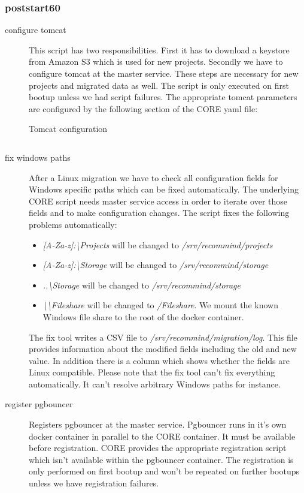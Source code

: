 			\subsubsection{poststart60}
			\begin{description}
				\item[configure tomcat] This script has two responsibilities. First it has to download a keystore from Amazon S3 which is used for new projects. Secondly we have to configure tomcat at the master service. These steps are necessary for new projects and migrated data as well. The script is only executed on first bootup unless we had script failures. The appropriate tomcat parameters are configured by the following section of the CORE yaml file:
				
				\begin{listing}[H]
					\caption{Tomcat configuration}
					\label{lst:p01:ch02:core_tomcat_desc}
					\inputminted{yaml}{\relative{chapter_02/section_3.2/tomcat_example.yaml}}
				\end{listing}
				\item[fix windows paths] After a Linux migration we have to check all configuration fields for Windows specific paths which can be fixed automatically. The underlying CORE script needs master service access in order to iterate over those fields and to make configuration changes. The script fixes the following problems automatically:
				\begin{itemize}
					\item \emph{[A-Za-z]:\textbackslash Projects} will be changed to \emph{/srv/recommind/projects}
					\item \emph{[A-Za-z]:\textbackslash Storage} will be changed to \emph{/srv/recommind/storage}
					\item \emph{..\textbackslash Storage} will be changed to \emph{/srv/recommind/storage}
					\item \emph{\textbackslash \textbackslash Fileshare} will be changed to \emph{/Fileshare}. We mount the known Windows file share to the root of the docker container.
				\end{itemize}
					
					The fix tool writes a CSV file to \emph{/srv/recommind/migration/log}. This file provides information about the modified fields including the old and new value. In addition there is a column which shows whether the fields are Linux compatible. Please note that the fix tool can't fix everything automatically. It can't resolve arbitrary Windows paths for instance.
				\item[register pgbouncer] Registers pgbouncer at the master service. Pgbouncer runs in it's own docker container in parallel to the CORE container. It must be available before registration. CORE provides the appropriate registration script which isn't available within the pgbouncer container. The registration is only performed on first bootup and won't be repeated on further bootups unless we have registration failures.
			\end{description}
